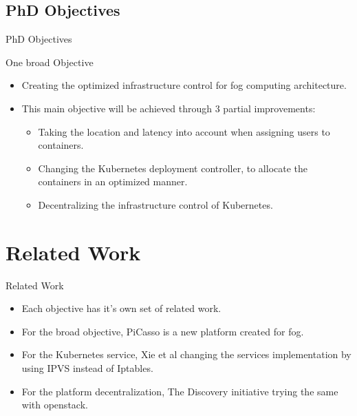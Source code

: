 \subsection{PhD Objectives}

\begin{withoutheadline}
\begin{frame}{PhD Objectives}
\begin{block}{One broad Objective }
    \begin{itemize}
    \item Creating the optimized infrastructure control for fog computing architecture.
    \item<2-> This main objective will be achieved through 3 partial improvements:
    	\begin{itemize}
    		\item Taking the location and latency into account when assigning users to containers.
    		\item Changing the Kubernetes deployment controller, to allocate the containers in an optimized manner.
    		\item Decentralizing the infrastructure control of Kubernetes. 
    	\end{itemize}
    \end{itemize}
\end{block}
\end{frame}
\end{withoutheadline}

\section{Related Work}

\begin{withoutheadline}
\begin{frame}{Related Work }

\begin{block}{}
    \begin{itemize}
    \item Each objective has it's own set of related work. 
    \item For the broad objective, PiCasso is a new platform created for fog.
    \item For the Kubernetes service, Xie et al changing the services implementation by using IPVS instead of Iptables.
    \item For the platform decentralization, The Discovery initiative trying the same with openstack.
    
    \end{itemize}
\end{block}
\end{frame}
\end{withoutheadline}
